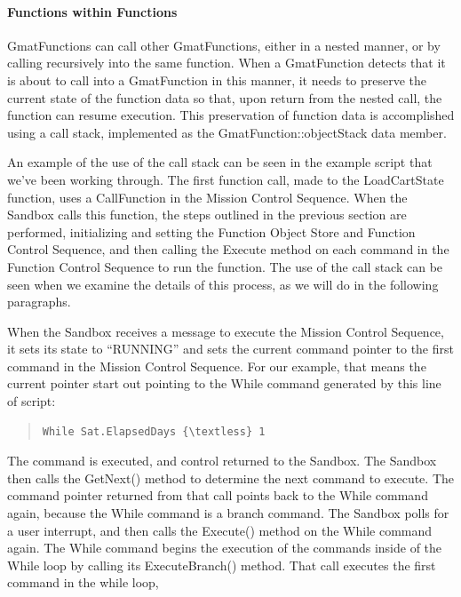 \paragraph{Functions within Functions}  GmatFunctions can call other GmatFunctions, either in a
nested manner, or by calling recursively into the same function.  When a GmatFunction detects that
it is about to call into a GmatFunction in this manner, it needs to preserve the current state of
the function data so that, upon return from the nested call, the function can resume execution. 
This preservation of function data is accomplished using a call stack, implemented as the
GmatFunction::\-objectStack data member.

An example of the use of the call stack can be seen in the example script that we've been working
through.  The first function call, made to the LoadCartState function, uses a CallFunction in the
Mission Control Sequence.  When the Sandbox calls this function, the steps outlined in the previous
section are performed, initializing and setting the Function Object Store and Function Control
Sequence, and then calling the Execute method on each command in the Function Control Sequence to
run the function.  The use of the call stack can be seen when we examine the details of this
process, as we will do in the following paragraphs.

When the Sandbox receives a message to execute the Mission Control Sequence, it sets its state to
``RUNNING'' and sets the current command pointer to the first command in the Mission Control
Sequence.  For our example, that means the current pointer start out pointing to the While command
generated by this line of script:

\begin{quote}
\begin{verbatim}
While Sat.ElapsedDays {\textless} 1
\end{verbatim}
\end{quote}

\noindent The command is executed, and control returned to the Sandbox.  The Sandbox then calls the
GetNext() method to determine the next command to execute.  The command pointer returned from that
call points back to the While command again, because the While command is a branch command.  The
Sandbox polls for a user interrupt, and then calls the Execute() method on the While command again. 
The While command begins the execution of the commands inside of the While loop by calling its
ExecuteBranch() method.  That call executes the first command in the while loop,


